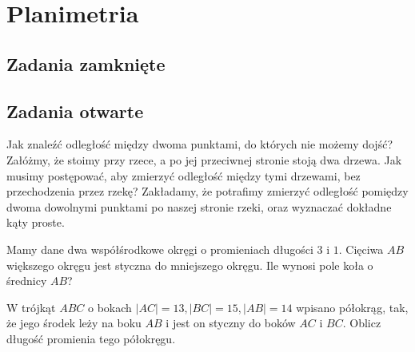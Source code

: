 \setcounter{parc}{0}
\addtocounter{chapc}{1}

\chapter{Planimetria}

\section{Zadania zamknięte}

\section{Zadania otwarte}

\zadanie Jak znaleźć odległość między dwoma punktami, do których nie możemy dojść? Załóżmy, że stoimy przy rzece, a po jej przeciwnej stronie stoją dwa drzewa. Jak musimy postępować, aby zmierzyć odległość między tymi drzewami, bez przechodzenia przez rzekę? Zakładamy, że potrafimy zmierzyć odległość pomiędzy dwoma dowolnymi punktami po naszej stronie rzeki, oraz wyznaczać dokładne kąty proste.

\zadanie Mamy dane dwa współśrodkowe okręgi o promieniach długości $3$ i $1$. Cięciwa $AB$ większego okręgu jest styczna do mniejszego okręgu. Ile wynosi pole koła o średnicy $AB$?

\zadanie W trójkąt $ABC$ o bokach $|AC| = 13, |BC| = 15, |AB| = 14$ wpisano półokrąg, tak, że jego środek leży na boku $AB$ i jest on styczny do boków $AC$ i $BC$. Oblicz długość promienia tego półokręgu.